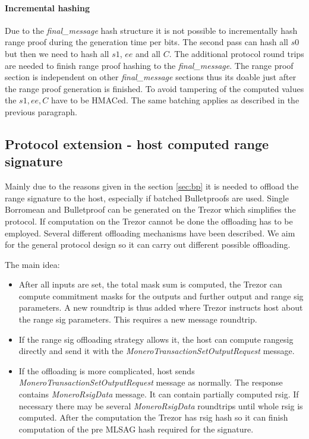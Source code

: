 \documentclass[]{article}
\begin{document}
\paragraph{Incremental hashing}
Due to the \emph{final\_message} hash structure it is not possible to incrementally hash range proof during the generation time per bits. The second pass can hash all $s0$ but then we need to hash all $s1$, $ee$ and all $C$. The additional protocol round trips are needed to finish range proof hashing to the \emph{final\_message}. The range proof section is independent on other \emph{final\_message} sections thus its doable just after the range proof generation is finished. To avoid tampering of the computed values the $s1, ee, C$ have to be HMACed. The same batching applies as described in the previous paragraph. 

\subsection{Protocol extension - host computed range signature}

Mainly due to the reasons given in the section \ref{sec:bp} it is needed to offload the range signature to the host, especially if batched Bulletproofs are used. Single Borromean and Bulletproof can be generated on the Trezor which simplifies the protocol. If computation on the Trezor cannot be done the offloading has to be employed. 
Several different offloading mechanisms have been described. We aim for the general protocol design so it can carry out different possible offloading. 

The main idea: 
\begin{itemize}
	\item After all inputs are set, the total mask sum is computed, the Trezor can compute commitment masks for the outputs and further output and range sig parameters.
	A new roundtrip is thus added where Trezor instructs host about the range sig parameters. This requires a new message roundtrip. 
	
	\item If the range sig offloading strategy allows it, the host can compute rangesig directly and send it with the \emph{MoneroTransactionSetOutputRequest} message. 
	
	\item If the offloading is more complicated, host sends \emph{MoneroTransactionSetOutputRequest} message as normally. The response contains \emph{MoneroRsigData} message. It can contain partially computed rsig. If necessary there may be several \emph{MoneroRsigData} roundtrips until whole rsig is computed. After the computation the Trezor has rsig hash so it can finish computation of the pre MLSAG hash required for the signature.
\end{itemize} 
\end{document}
